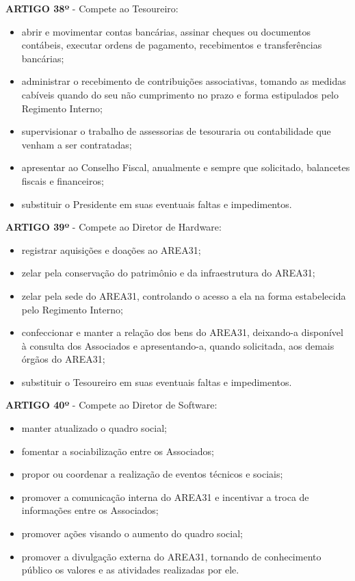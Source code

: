 \textbf{ARTIGO 38º} - Compete ao Tesoureiro:

\begin{itemize}
    \item abrir e movimentar contas bancárias, assinar cheques ou documentos 
        contábeis, executar ordens de pagamento, recebimentos e 
        transferências bancárias;
    \item administrar o recebimento de contribuições associativas, 
        tomando as medidas cabíveis quando do seu não cumprimento no 
        prazo e forma estipulados pelo Regimento Interno;
    \item supervisionar o trabalho de assessorias de tesouraria ou 
        contabilidade que venham a ser contratadas;
    \item apresentar ao Conselho Fiscal, anualmente e sempre que solicitado, 
        balancetes fiscais e financeiros; 
    \item substituir o Presidente em suas eventuais faltas e impedimentos.
\end{itemize}

\textbf{ARTIGO 39º} - Compete ao Diretor de Hardware:

\begin{itemize}
    \item registrar aquisições e doações ao AREA31;
    \item zelar pela conservação do patrimônio e da infraestrutura do AREA31;
    \item zelar pela sede do AREA31, controlando o acesso a ela na forma 
        estabelecida pelo Regimento Interno;
    \item confeccionar e manter a relação dos bens do AREA31, deixando-a 
        disponível à consulta dos Associados e apresentando-a, 
        quando solicitada, aos demais órgãos do AREA31;
    \item substituir o Tesoureiro em suas eventuais faltas e impedimentos.
\end{itemize}

\textbf{ARTIGO 40º} - Compete ao Diretor de Software:

\begin{itemize}
    \item manter atualizado o quadro social;
    \item fomentar a sociabilização entre os Associados;
    \item propor ou coordenar a realização de eventos técnicos e sociais;
    \item promover a comunicação interna do AREA31 e incentivar a troca de 
        informações entre os Associados;
    \item promover ações visando o aumento do quadro social;
    \item promover a divulgação externa do AREA31, tornando de conhecimento 
        público os valores e as atividades realizadas por ele.
\end{itemize}
